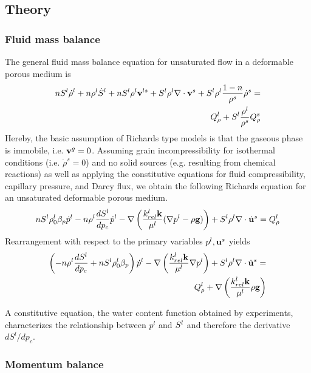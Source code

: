 \subsection{Theory}

\subsubsection{Fluid mass balance}

The general fluid mass balance equation for unsaturated flow in a deformable porous medium is
%
\begin{eqnarray}
n S^l \dot\rho^l
+
n \rho^l \dot S^l
+
n S^l \rho^l \mathbf v^{ls}
+
S^l \rho^l \nabla\cdot\mathbf v^s
+
S^l \rho^l \frac{1-n}{\rho^s} \dot\rho^s
=
\nonumber \\
Q_\rho^l + S^l \frac{\rho^l}{\rho^s} Q_\rho^s
\label{eqn:uc1}
\end{eqnarray}
%
Hereby, the basic assumption of Richards type models is that the gaseous phase is immobile, i.e. $\mathbf v^g=0$.
Assuming grain incompressibility for isothermal conditions (i.e. $\dot\rho^s=0$) and no solid sources (e.g. resulting from chemical reactions) as well as
applying the constitutive equations for fluid compressibility, capillary pressure, and Darcy flux,
we obtain the following Richards equation for an unsaturated deformable porous medium.
%
\begin{eqnarray}
n S^l \rho_0^l \beta_p \dot p^l
-
n \rho^l \frac{dS^l}{d p_c} \dot p^l
-
\nabla
\left(
\dfrac{k_{rel}^l\mathbf k}{\mu^l}(\nabla p^l - \rho\mathbf g)
\right)
+
S^l \rho^l \nabla\cdot \dot{\mathbf u}^s
=
Q_\rho^l
\label{eqn:uc2}
\end{eqnarray}
%
Rearrangement with respect to the primary variables $p^l, \mathbf u^s$ yields
%
\begin{eqnarray}
\left(
-
n \rho^l \frac{dS^l}{d p_c}
+
n S^l \rho_0^l \beta_p
\right)
\dot p^l
-
\nabla
\left(
\dfrac{k_{rel}^l\mathbf k}{\mu^l} \nabla p^l
\right)
+
S^l \rho^l \nabla\cdot \dot{\mathbf u}^s
=
\nonumber\\
Q_\rho^l
+
\nabla
\left(
\dfrac{k_{rel}^l\mathbf k}{\mu^l}\rho\mathbf g
\right)
\label{eqn:uc2}
\end{eqnarray}
%

A constitutive equation, the water content function obtained by experiments, characterizes the relationship between $p^l$ and $S^l$ and therefore the derivative $dS^l/dp_c$.

\subsubsection{Momentum balance}

